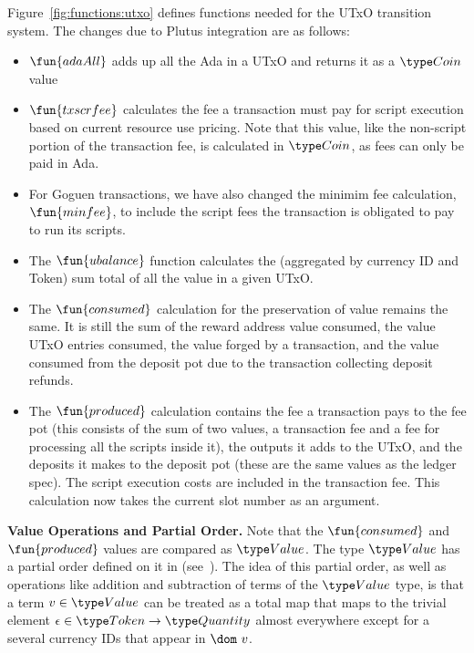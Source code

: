 Figure~\ref{fig:functions:utxo} defines functions needed for the UTxO transition system.
The changes due to Plutus integration are as follows:

\begin{itemize}

  \item $\fun{adaAll}$ adds up all the Ada in a UTxO and returns it as a
  $\Coin$ value

  \item $\fun{txscrfee}$ calculates the fee a transaction must pay for script
  execution based on current resource use pricing. Note that this value,
  like the non-script portion of the transaction fee, is calculated in $\Coin$,
  as fees can only be paid in Ada.

  \item For Goguen transactions, we have also changed the minimim fee calculation, $\fun{minfee}$,
  to include the script fees the transaction is obligated to pay to run its
  scripts.

  \item
    The $\fun{ubalance}$ function calculates the (aggregated by currency ID and
    Token) sum total of all the value in a given UTxO.

  \item The $\fun{consumed}$ calculation for the preservation of value remains the
  same. It is still the sum of the reward address value consumed, the value
   UTxO entries consumed, the value forged by a transaction,
   and the value consumed from the deposit pot due
   to the transaction collecting deposit refunds.

  \item The $\fun{produced}$ calculation contains the fee a transaction pays
  to the fee pot (this consists of the sum of two values, a transaction fee and a
  fee for processing all the scripts inside it), the outputs it adds to the UTxO,
  and the deposits it makes
  to the deposit pot (these are the same values as the ledger spec).
  The script execution costs are included in the transaction fee.
  This calculation now takes the current slot number as an argument.
\end{itemize}

\textbf{Value Operations and Partial Order.}
Note that
the $\fun{consumed}$ and $\fun{produced}$ values are compared as $\Value$.
The type $\Value$ has a partial order defined on it in (see~\cite{plutus_eutxo}).
The idea of this partial order, as well as operations like addition and subtraction
of terms of the $\Value$ type, is that a term $v \in \Value$ can be treated
as a total map that maps to the trivial element $\epsilon \in \Token \to \Quantity$
almost everywhere except for a several currency IDs that appear in $\dom~v$.

